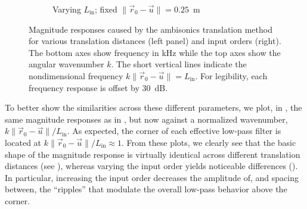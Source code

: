 \begin{figure}[t]
\begin{subfigure}[b]{0.49\textwidth}
    \caption{Varying $L_\text{in}$; fixed $\| \vec{r}_0 - \vec{u} \| = 0.25$~m}
    \label{fig:03_Navigation_Techniques:SRE_RollOff:InputOrders}
  \end{subfigure}
  \caption[Magnitude responses caused by the ambisonics translation method.]{
  Magnitude responses caused by the ambisonics translation method for various translation distances (left panel) and input orders (right).
  The bottom axes show frequency in kHz while the top axes show the angular wavenumber $k$.
  The short vertical lines indicate the nondimensional frequency $k \| \vec{r}_0 - \vec{u} \| = L_\text{in}$.
  For legibility, each frequency response is offset by $30$~dB.}
  \label{fig:03_Navigation_Techniques:SRE_RollOff}
\end{figure} %

To better show the similarities across these different parameters, we plot, in , the same magnitude responses as in , but now against a normalized wavenumber, $k \| \vec{r}_0 - \vec{u} \| / L_\text{in}$.
As expected, the corner of each effective low-pass filter is located at $k \| \vec{r}_0 - \vec{u} \| / L_\text{in} \approx 1$.
From these plots, we clearly see that the basic shape of the magnitude response is virtually identical across different translation distances (see ), whereas varying the input order yields noticeable differences ().
In particular, increasing the input order decreases the amplitude of, and spacing between, the ``ripples'' that modulate the overall low-pass behavior above the corner.

